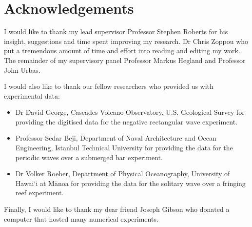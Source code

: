 
\chapter*{Acknowledgements}\label{acknowledgements}

I would like to thank my lead supervisor Professor Stephen Roberts for his insight, suggestions and time spent improving my research. Dr Chris Zoppou who put a tremendous amount of time and effort into reading and editing my work. The remainder of my supervisory panel Professor Markus Hegland and Professor John Urbas.

I would also like to thank our fellow researchers who provided us with experimental data:
\begin{itemize}
	\item Dr David George, Cascades Volcano Observatory, U.S. Geological Survey for providing the digitised data for the negative rectangular wave experiment.
	\item Professor Sedar Beji, Department of Naval Architecture and Ocean Engineering, Istanbul Technical University for providing the data for the periodic waves over a submerged bar experiment.
	\item Dr Volker Roeber, Department of Physical Oceanography, University of Hawai`i at M\={a}noa for providing the data for the solitary wave over a fringing reef experiment.
\end{itemize}

Finally, I would like to thank my dear friend Joseph Gibson who donated a computer that hosted many numerical experiments. 
